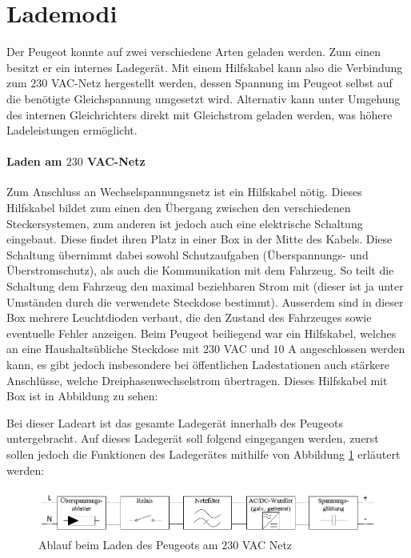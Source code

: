 \section{Lademodi}
Der Peugeot konnte auf zwei verschiedene Arten geladen werden. Zum einen besitzt er ein internes Ladegerät. Mit einem Hilfskabel kann also die Verbindung zum $230$ VAC-Netz hergestellt werden, dessen Spannung im Peugeot selbst auf die benötigte Gleichspannung umgesetzt wird. Alternativ kann unter Umgehung des internen Gleichrichters direkt mit Gleichstrom geladen werden, was höhere Ladeleistungen ermöglicht.

\paragraph{Laden am $230$ VAC-Netz}
Zum Anschluss an Wechselspannungsnetz ist ein Hilfskabel nötig. Dieses Hilfskabel bildet zum einen den Übergang zwischen den verschiedenen Steckersystemen, zum anderen ist jedoch auch eine elektrische Schaltung eingebaut. Diese findet ihren Platz in einer Box in der Mitte des Kabels. Diese Schaltung übernimmt dabei sowohl Schutzaufgaben (Überspannungs- und Überstromschutz), als auch die Kommunikation mit dem Fahrzeug. So teilt die Schaltung dem Fahrzeug den maximal beziehbaren Strom mit (dieser ist ja unter Umständen durch die verwendete Steckdose bestimmt). Ausserdem sind in dieser Box mehrere Leuchtdioden verbaut, die den Zustand des Fahrzeuges sowie eventuelle Fehler anzeigen. Beim Peugeot beiliegend war ein Hilfskabel, welches an eine Haushaltsübliche Steckdose mit $230$ VAC und $10$ A angeschlossen werden kann, es gibt jedoch insbesondere bei öffentlichen Ladestationen auch stärkere Anschlüsse, welche Dreiphasenwechselstrom übertragen. Dieses Hilfskabel mit Box ist in Abbildung  zu sehen:

Bei dieser Ladeart ist das gesamte Ladegerät innerhalb des Peugeots untergebracht. Auf dieses Ladegerät soll folgend eingegangen werden, zuerst sollen jedoch die Funktionen des Ladegerätes mithilfe von Abbildung \ref{fig:Laden_Peugeot} erläutert werden:

\begin{figure}[h]
	\centering
		\includegraphics[width=1.00\textwidth]{images/Laden_Peugeot.PNG}
	\caption{Ablauf beim Laden des Peugeots am $230$ VAC Netz}
	\label{fig:Laden_Peugeot}
\end{figure}

